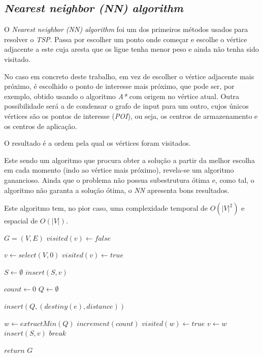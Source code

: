 \documentclass[12pt,a4paper]{report}
\begin{document}
		\subsection{\textit{Nearest neighbor (NN) algorithm}}
		\label{algo:nn}
		O \textit{Nearest neighbor (NN) algorithm} \cite{nearestneighbor} foi um dos primeiros métodos usados para resolver o \textit{TSP}. Passa por escolher um ponto onde começar e escolhe o vértice adjacente a este cuja aresta que os ligue tenha menor peso e ainda não tenha sido visitado. \par
		No caso em concreto deste trabalho, em vez de escolher o vértice adjacente mais próximo, é escolhido o ponto de interesse mais próximo, que pode ser, por exemplo, obtido usando o algoritmo \textit{A*} com origem no vértice atual. Outra possibilidade será a de condensar o grafo de input para um outro, cujos únicos vértices são os pontos de interesse (\textit{POI}), ou seja, os centros de armazenamento e os centros de aplicação. \par
		O resultado é a ordem pela qual os vértices foram visitados. \par
		Este sendo um algoritmo que procura obter a solução a partir da melhor escolha em cada momento (indo ao vértice mais próximo), revela-se um algoritmo ganancioso. Ainda que o problema não possua subestrutura ótima e, como tal, o algoritmo não garanta a solução ótima, o \textit{NN} apresenta bons resultados. \par
		Este algoritmo tem, no pior caso, uma complexidade temporal de \(O(|V|^2) \) e espacial de \( O(|V|)\).

		\begin{center}
			\begin{algorithmic}[1]
				\State $G = (V, E)$
				\newline
					\State $visited(v) \leftarrow false$
				\EndFor

				\State $v \leftarrow select(V, 0)$
				\State $visited(v) \leftarrow true$

				\State $S \leftarrow \emptyset$
				\State $ insert(S, v) $

				\State $count \leftarrow 0$
					\State $Q \leftarrow \emptyset$

						\State $insert (Q, (destiny(e), distance))$
					\EndFor

						\State $w \leftarrow extractMin(Q)$
							\State $increment(count)$
							\State $visited(w) \leftarrow true$
							\State $v \leftarrow w$
							\State $insert(S,v)$
							\State $break$
						\EndIf
					\EndWhile

				\EndWhile
				\State $return$ $G$
				\EndFunction
			\end{algorithmic}
		\end{center}
\end{document}
